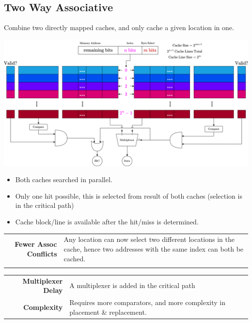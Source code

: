 \subsection{Two Way Associative}
Combine two directly mapped caches, and only cache a given location in one.
\begin{center}
	\includegraphics[width=.9\textwidth]{caches/images/two_way_set_associative.drawio.png}
\end{center}
\begin{itemize}
	\item Both caches searched in parallel.
	\item Only one hit possible, this is selected from result of both caches (selection is in the critical path)
	\item Cache block/line is available after the hit/miss is determined.
\end{itemize}

\begin{prosbox}
	\begin{center}
		\begin{tabular}{r p{}}
			\textbf{Fewer Assoc Conflicts} & Any location can now select two different locations in the cache, hence two addresses with the same index can both be cached. \\
			\textbf{}
		\end{tabular}
	\end{center}
\end{prosbox}
\begin{consbox}
	\begin{center}
		\begin{tabular}{r p{}}
			\textbf{Multiplexer Delay} & A multiplexer is added in the critical path                                 \\
			\textbf{Complexity}        & Requires more comparators, and more complexity in placement \& replacement. \\
		\end{tabular}
	\end{center}
\end{consbox}

